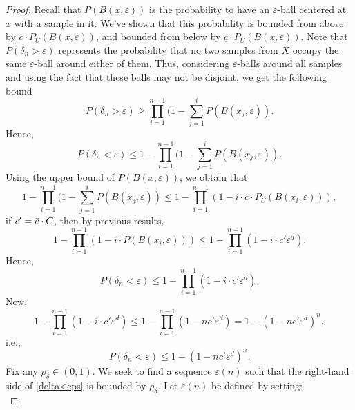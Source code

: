 \documentclass{article}
\begin{document}
\begin{proof}
    Recall that $P( B(x,\varepsilon))$ is the probability to have an  $\varepsilon$-ball centered at $x$ with a sample in it. We've shown  that this probability is bounded from above by $\bar{c}\cdot P_{U}(B(x,\varepsilon))$, and bounded from below by $\underline{c}\cdot P_{U}(B(x,\varepsilon))$. 
    Note that $P(\delta_n>\varepsilon)$ represents the probability that no two samples from $X$ occupy the same $\varepsilon$-ball around either of them. Thus, considering $\varepsilon$-balls around all samples and using the fact that these balls may not be disjoint, we get the following bound
\begin{equation}
      P(\delta_n>\varepsilon)\geq \prod_{i=1}^{n-1} (1-\sum_{j=1}^i P(B(x_j,\varepsilon)).
 \end{equation}
 Hence, 
\begin{equation}
      P(\delta_n<\varepsilon)\leq 1- \prod_{i=1}^{n-1} (1-\sum_{j=1}^i P(B(x_j,\varepsilon)).
 \end{equation}
 Using the upper bound of $P(B(x,\varepsilon))$, we obtain that 
 \begin{equation}
 1-\prod_{i=1}^{n-1} (1-\sum_{j=1}^i P(B(x_j,\varepsilon)) \leq 1-\prod_{i=1}^{n-1} (1-i \cdot \bar{c} \cdot P_{U}(B(x_i,\varepsilon))),
 \end{equation}
if $c'=\Bar{c}\cdot C$, then by previous results,
\begin{equation}
 1- \prod_{i=1}^{n-1} (1-i \cdot P\left(B(x_i,\varepsilon)\right))\leq 1- \prod_{i=1}^{n-1} (1-i \cdot c' \varepsilon^d).
\end{equation}
Hence, 
\begin{equation}
 P\left(\delta_n<\varepsilon\right) \leq 1-\prod_{i=1}^{n-1} (1-i \cdot c' \varepsilon^d).
\end{equation}
Now,
\begin{equation}
    1-\prod_{i=1}^{n-1}\left(1-i \cdot c' \varepsilon^d\right) \leq 1- \prod_{i=1}^{n-1}\left(1-nc' \varepsilon^d\right)=1-\left(1-nc' \varepsilon^d\right)^n,
\end{equation}
i.e., 
\begin{equation}
  P\left(\delta_n<\varepsilon\right) \leq 1- \left(1-nc' \varepsilon^d\right)^n.
  \label{delta<eps}
\end{equation}
Fix any $\rho_\delta \in (0,1)$. We seek to find a sequence $\varepsilon(n)$ such that the right-hand side of \eqref{delta<eps} is bounded by $\rho_\delta$. Let $\varepsilon(n)$ be defined by setting:
\begin{equation}

\end{equation}
\end{proof}
\end{document}
